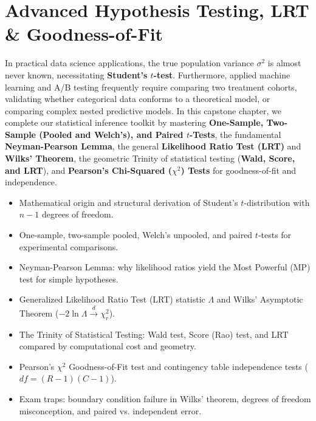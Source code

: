 \chapter{Advanced Hypothesis Testing, LRT \& Goodness-of-Fit}

In practical data science applications, the true population variance $\sigma^2$ is almost never known, necessitating \textbf{Student's $t$-test}. Furthermore, applied machine learning and A/B testing frequently require comparing two treatment cohorts, validating whether categorical data conforms to a theoretical model, or comparing complex nested predictive models. In this capstone chapter, we complete our statistical inference toolkit by mastering \textbf{One-Sample, Two-Sample (Pooled and Welch's), and Paired $t$-Tests}, the fundamental \textbf{Neyman-Pearson Lemma}, the general \textbf{Likelihood Ratio Test (LRT)} and \textbf{Wilks' Theorem}, the geometric Trinity of statistical testing (\textbf{Wald, Score, and LRT}), and \textbf{Pearson's Chi-Squared ($\chi^2$) Tests} for goodness-of-fit and independence.

\vspace{0.5cm}
\begin{tcolorbox}[colback=primarylight, colframe=primarydark, title={\textbf{What You'll Learn in this Chapter}}]
\begin{itemize}
    \item Mathematical origin and structural derivation of Student's $t$-distribution with $n-1$ degrees of freedom.
    \item One-sample, two-sample pooled, Welch's unpooled, and paired $t$-tests for experimental comparisons.
    \item Neyman-Pearson Lemma: why likelihood ratios yield the Most Powerful (MP) test for simple hypotheses.
    \item Generalized Likelihood Ratio Test (LRT) statistic $\Lambda$ and Wilks' Asymptotic Theorem ($-2 \ln \Lambda \xrightarrow{d} \chi_r^2$).
    \item The Trinity of Statistical Testing: Wald test, Score (Rao) test, and LRT compared by computational cost and geometry.
    \item Pearson's $\chi^2$ Goodness-of-Fit test and contingency table independence tests ($df = (R-1)(C-1)$).
    \item Exam traps: boundary condition failure in Wilks' theorem, degrees of freedom misconception, and paired vs. independent error.
\end{itemize}
\end{tcolorbox}

